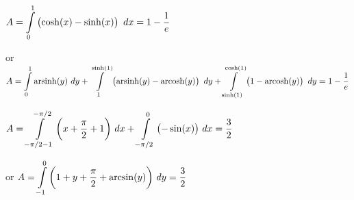 \begin{Answer}
\ifanalysis

\Question $A= \displaystyle \int\limits_{0}^{1} \left( \cosh(x) - \sinh(x) \right) \ dx = 1-\dfrac{1}{e}$

 or \quad $A= \ds \int\limits_{0}^{1} \arsinh(y)\ dy + \ds \int\limits_{1}^{\sinh(1)} \left( \arsinh(y)- \arcosh(y) \right) \ dy + \ds \int\limits_{\sinh(1)}^{\cosh(1)} \left( 1 - \arcosh(y)\right)\ dy= 1-\dfrac{1}{e}$

\fi

\Question $A= \displaystyle \int\limits_{-\pi/2-1}^{-\pi/2} \left( x + \dfrac{\pi}{2} + 1 \right) \, dx + \displaystyle \int\limits_{-\pi/2}^{0} \left(- \sin(x) \right) \, dx = \dfrac{3}{2}$

 or \quad $ A=\displaystyle \int\limits_{-1}^{0} \left( 1+y+  \dfrac{\pi}{2} + \arcsin(y) \right)\, dy= \dfrac{3}{2}$

\end{Answer}

